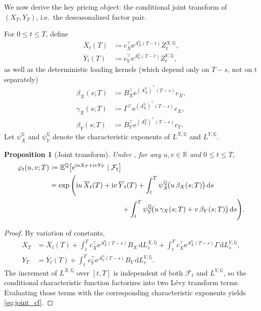 \documentclass[10pt,a4paper,reqno]{amsart}
\newtheorem{proposition}[theorem]{Proposition}
\newcommand{\R}{\mathbb{R}}
\newcommand{\E}{\mathbb{E}}
\newcommand{\Q}{\mathbb{Q}}
\newcommand{\F}{\mathcal{F}}
\newcommand{\1}{\mathbbm{1}}
\newcommand{\dd}{\mathrm{d}}
\newcommand{\ii}{\mathrm{i}}
\newcommand{\ee}{\mathrm{e}}
\begin{document}
We now derive the key pricing object: the conditional joint transform of
$(X_T,Y_T)$, i.e.\ the deseasonalized factor pair.

For $0 \le t \le T$, define
\begin{align*}
  \overline{X}_t(T)
    &\coloneqq c_X^\top \ee^{A_X^\Q (T-t)} Z_t^{X,\Q},\\
  \overline{Y}_t(T)
    &\coloneqq c_Y^\top \ee^{A_Y^\Q (T-t)} Z_t^{Y,\Q},
\end{align*}
as well as the deterministic loading kernels (which depend only on $T-s$,
not on $t$ separately)
\begin{align}
  \beta_X(s;T)
    &\coloneqq B_X^\top \ee^{(A_X^\Q)^\top (T-s)} c_X,
    \label{eq:betaX}\\
  \gamma_X(s;T)
    &\coloneqq \Gamma^\top \ee^{(A_X^\Q)^\top (T-s)} c_X,
    \label{eq:gammaX}\\
  \beta_Y(s;T)
    &\coloneqq B_Y^\top \ee^{(A_Y^\Q)^\top (T-s)} c_Y.
    \label{eq:betaY}
\end{align}
Let $\psi_X^\Q$ and $\psi_Y^\Q$ denote the characteristic exponents of
$L^{X,\Q}$ and $L^{Y,\Q}$.

\begin{proposition}[Joint transform]
\label{prop:joint_cf}
Under , for any $u,v \in \R$ and $0 \le t \le T$,
\begin{align}
  \varphi_t(u,v;T)
  &\coloneqq \E^\Q\!\left[
      \ee^{\ii u X_T + \ii v Y_T}
      \mid \F_t
    \right] \nonumber\\
  &= \exp\Bigg(
      \ii u\, \overline{X}_t(T)
      + \ii v\, \overline{Y}_t(T)
      + \int_t^T \psi_X^\Q\!\big(u\,\beta_X(s;T)\big)\,\dd s
      \nonumber\\
      &\hspace{3.6cm}
      + \int_t^T \psi_Y^\Q\!\big(
          u\,\gamma_X(s;T)
          + v\,\beta_Y(s;T)
        \big)\,\dd s
    \Bigg).
    \label{eq:joint_cf}
\end{align}
\end{proposition}

\begin{proof}
By variation of constants,
\begin{align*}
  X_T
  &= \overline{X}_t(T)
     + \int_t^T c_X^\top \ee^{A_X^\Q(T-s)} B_X\,\dd L_s^{X,\Q}
     + \int_t^T c_X^\top \ee^{A_X^\Q(T-s)} \Gamma\,\dd L_s^{Y,\Q},\\
  Y_T
  &= \overline{Y}_t(T)
     + \int_t^T c_Y^\top \ee^{A_Y^\Q(T-s)} B_Y\,\dd L_s^{Y,\Q}.
\end{align*}
The increment of $L^{X,\Q}$ over $[t,T]$ is independent of both $\F_t$
and $L^{Y,\Q}$, so the conditional characteristic function factorizes into two
Lévy transform terms. Evaluating those terms with the corresponding
characteristic exponents yields \eqref{eq:joint_cf}.
\end{proof}
\end{document}

